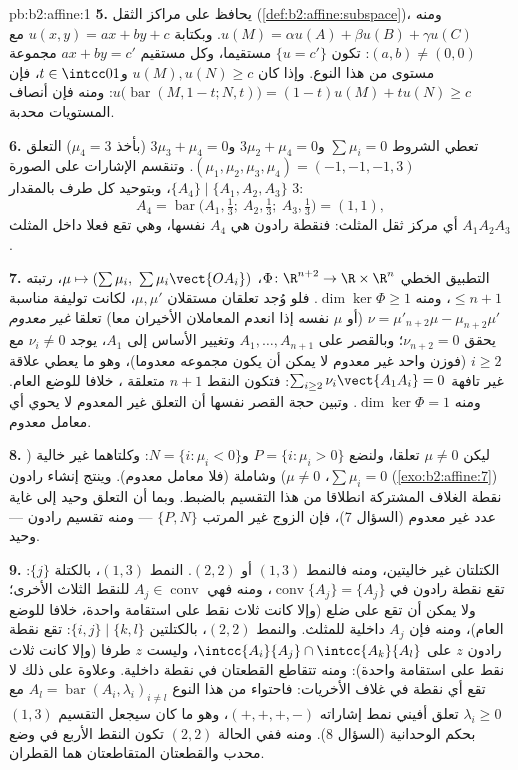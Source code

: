 \begin{solution}{pb:b2:affine:1}
\textbf{5.} يحافظ  على مراكز الثقل (\cref{def:b2:affine:subspace})، ومنه
$u(M) = \alpha u(A) +
\beta u(B) + \gamma u(C)$. وبكتابة $u(x, y) = ax + by + c$ مع $(a, b) \neq (0,0)$: تكون $\{u = c'\}$ مستقيما، وكل مستقيم
$ax + by = c'$ مجموعة مستوى من هذا النوع. وإذا كان $u(M), u(N) \geq
c$ و$t \in \intcc01$، فإن
$u\bigl(\operatorname{bar}(M,
1-t; N, t)\bigr) = (1-t)u(M) + tu(N) \geq c$: ومنه فإن أنصاف المستويات محدبة.

\textbf{6.} تعطي الشروط $\sum\mu_i = 0$ و$3\mu_2 + \mu_4 =
0$ و$3\mu_3 + \mu_4 = 0$ (بأخذ $\mu_4 = 3$)
التعلق $(\mu_1, \mu_2, \mu_3, \mu_4) = (-1, -1, -1, 3)$.
وتنقسم الإشارات على الصورة $\{A_4\} \mid \{A_1, A_2, A_3\}$، وبتوحيد كل طرف بالمقدار $3$:
\[
A_4 = \operatorname{bar}\bigl(A_1, \tfrac13;\ A_2, \tfrac13;\
A_3, \tfrac13\bigr) = (1,1),
\]
أي مركز ثقل المثلث: فنقطة رادون هي $A_4$ نفسها، وهي تقع فعلا داخل
المثلث $A_1A_2A_3$.

\textbf{7.} التطبيق الخطي $\Phi \colon \R^{n+2} \to \R
\times \R^n$، $\mu \mapsto (\sum\mu_i,\
\sum\mu_i\vect{OA_i})$، رتبته $\leq n + 1$، ومنه
$\dim\ker
\Phi \geq 1$. فلو وُجد تعلقان مستقلان $\mu, \mu'$، لكانت توليفة مناسبة $\nu = \mu'_{n+2}\mu -
\mu_{n+2}\mu'$
(أو $\mu$ نفسه إذا انعدم المعاملان الأخيران معا) تعلقا \emph{غير
معدوم} يحقق $\nu_{n+2}
= 0$؛ وبالقصر على $A_1, \dots, A_{n+1}$ وتغيير الأساس إلى $A_1$،
يوجد $\nu_i \neq 0$ مع $i \geq 2$ (فوزن واحد غير معدوم لا يمكن أن يكون مجموعه
معدوما)، وهو ما يعطي علاقة غير تافهة $\sum_{i\geq2}\nu_i\vect{A_1A_i} = 0$: فتكون النقط $n+1$
متعلقة \omterm{def:b2:affine:subspace}{أفينيا}، خلافا للوضع العام. ومنه $\dim\ker
\Phi = 1$. وتبين حجة القصر
نفسها أن التعلق غير المعدوم لا يحوي أي معامل معدوم.

\textbf{8.} ليكن $\mu \neq 0$ تعلقا، ولنضع $P = \{i :
\mu_i > 0\}$ و$N = \{i : \mu_i < 0\}$: وكلتاهما غير
خالية ($\sum\mu_i = 0$، $\mu \neq 0$) وشاملة (فلا معامل معدوم). وينتج إنشاء رادون
(\cref{exo:b2:affine:7}) نقطة الغلاف المشتركة انطلاقا من هذا التقسيم بالضبط.
وبما أن التعلق وحيد إلى غاية عدد غير معدوم (السؤال 7)، فإن الزوج
غير المرتب $\{P, N\}$ --- ومنه تقسيم رادون --- وحيد.

\textbf{9.} الكتلتان غير خاليتين، ومنه فالنمط $(1,3)$ أو $(2,2)$.
النمط $(1,3)$، بالكتلة $\{j\}$: تقع نقطة رادون في $\operatorname{conv}\{A_j\} = \{A_j\}$، ومنه فهي
$A_j \in
\operatorname{conv}$ للنقط الثلاث الأخرى؛ ولا يمكن أن تقع على ضلع (وإلا كانت ثلاث
نقط على استقامة واحدة، خلافا للوضع العام)، ومنه فإن $A_j$ داخلية
للمثلث. والنمط $(2,2)$، بالكتلتين $\{i,j\} \mid \{k,l\}$: تقع نقطة رادون $z$ على
$\intcc{A_i}{A_j} \cap \intcc{A_k}{A_l}$، وليست $z$ طرفا (وإلا كانت ثلاث نقط على استقامة واحدة):
ومنه تتقاطع القطعتان في نقطة داخلية. وعلاوة على ذلك لا تقع أي نقطة
في غلاف الأخريات: فاحتواء من هذا النوع $A_l =
\operatorname{bar}(A_i, \lambda_i)_{i \neq l}$ مع $\lambda_i \geq 0$ تعلق أفيني
نمط إشاراته $(+,+,+,-)$، وهو ما كان سيجعل التقسيم $(1,3)$ بحكم الوحدانية
(السؤال 8). ومنه ففي الحالة $(2,2)$ تكون النقط الأربع في وضع محدب
والقطعتان المتقاطعتان هما القطران.


\end{solution}
